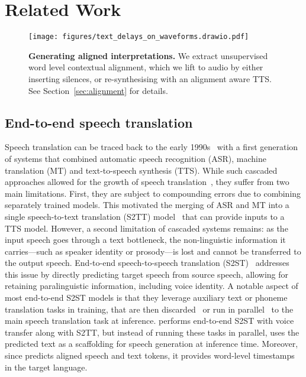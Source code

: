 \section{Related Work}
\label{related-work}

\begin{figure}[t]
    \centering
    \texttt{[image: figures/text\_delays\_on\_waveforms.drawio.pdf]}
    \caption{\textbf{Generating aligned interpretations.}
        We extract unsupervised word level contextual alignment, which we lift to audio by either inserting
        silences, or re-synthesising with an alignment aware TTS. See Section~\ref{sec:alignment} for details.
    }
    \label{fig:contextual-delays-waveform}
\end{figure}



\subsection{End-to-end speech translation}
Speech translation can be traced back to the early 1990s~\cite{connectionist_translation} with a first generation of systems that combined automatic speech recognition (ASR), machine translation (MT) and text-to-speech synthesis (TTS). While such cascaded approaches allowed for the growth of speech translation~\cite{wahlster2000verbmobil, nakamura2006atr}, they suffer from two main limitations. First, they are subject to compounding errors due to combining separately trained models. This motivated the merging of ASR and MT into a single speech-to-text translation (S2TT) model~\cite{s2tt_berard2016, s2tt_weiss_2017, s2tt_wang_2020, s2tt_wang_2021} that can provide inputs to a TTS model. However, a second limitation of cascaded systems remains: as the input speech goes through a text bottleneck, the non-linguistic information it carries---such as speaker identity or prosody---is lost and cannot be transferred to the output speech. End-to-end speech-to-speech translation (S2ST)~\cite{jia19_translatotron,lee-etal-2022-direct,jia22-translatotron2,audiopalm} addresses this issue by directly predicting target speech from source speech, allowing for retaining paralinguistic information, including voice identity. A notable aspect of most end-to-end S2ST models is that they leverage auxiliary text or phoneme translation tasks in training, that are then discarded~\cite{jia22-translatotron2} or run in parallel~\cite{streamspeech} to the main speech translation task at inference. \ours performs end-to-end S2ST with voice transfer along with S2TT, but instead of running these tasks in parallel, \ours uses the predicted text as a scaffolding for speech generation at inference time. Moreover, since \ours predicts aligned speech and text tokens, it provides word-level timestamps in the target language. 
